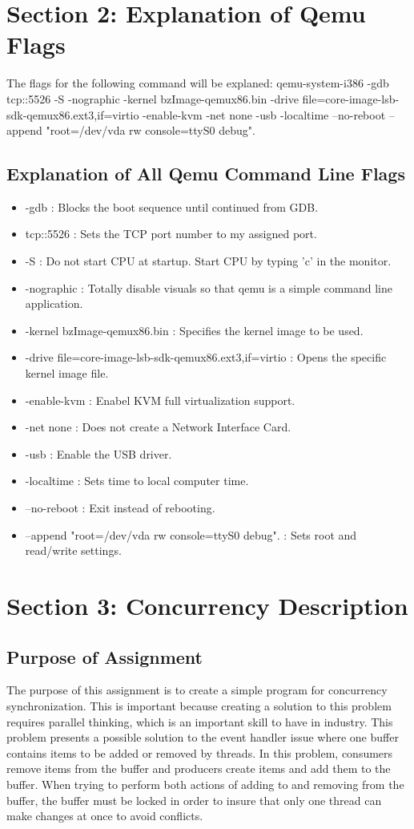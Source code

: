 \documentclass[letterpaper,10pt]{article}
\begin{document}
\section{Section 2: Explanation of Qemu Flags}
The flags for the following command will be explaned: \newline
qemu-system-i386 -gdb tcp::5526 -S -nographic -kernel bzImage-qemux86.bin -drive
file=core-image-lsb-sdk-qemux86.ext3,if=virtio -enable-kvm -net none -usb
-localtime --no-reboot --append "root=/dev/vda rw console=ttyS0 debug".\newline

\subsection{Explanation of All Qemu Command Line Flags}
\begin{itemize}
\item -gdb : Blocks the boot sequence until continued from GDB.
\item tcp::5526 : Sets the TCP port number to my assigned port.
\item -S : Do not start CPU at startup. Start CPU by typing 'c' in the monitor.
\item -nographic : Totally disable visuals so that qemu is a simple command line
application.
\item -kernel bzImage-qemux86.bin : Specifies the kernel image to be used.
\item -drive file=core-image-lsb-sdk-qemux86.ext3,if=virtio : Opens the specific
kernel image file.
\item -enable-kvm : Enabel KVM full virtualization support.
\item -net none : Does not create a Network Interface Card.
\item -usb : Enable the USB driver.
\item -localtime : Sets time to local computer time.
\item --no-reboot : Exit instead of rebooting.
\item --append "root=/dev/vda rw console=ttyS0 debug". : Sets root and
read/write settings.
\end{itemize}

\section{Section 3: Concurrency Description}
\subsection{Purpose of Assignment}
The purpose of this assignment is to create a simple program for concurrency
synchronization. This is important because creating a solution to this problem
requires parallel thinking, which is an important skill to have in industry.
This problem presents a possible solution to the event handler issue where one
buffer contains items to be added or removed by threads. In this problem,
consumers remove items from the buffer and producers create items and add them
to the buffer. When trying to perform both actions of adding to and removing
from the buffer, the buffer must be locked in order to insure that only one
thread can make changes at once to avoid conflicts.
\end{document}
